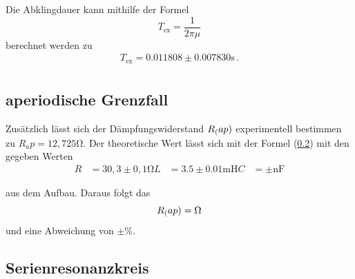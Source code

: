 \noindent
Die Abklingdauer kann mithilfe der Formel 
\begin{equation*}
    T_\text{ex} = \frac{1}{2\pi\mu} 
\end{equation*}
berechnet werden zu
\begin{align*}
    T_\text{ex} = 0.011808 \pm 0.007830 \si{\second} \, . \\
\end{align*}



\subsection{aperiodische Grenzfall}
Zusätzlich lässt sich der Dämpfungswiderstand $R_\text(ap)$ experimentell bestimmen zu $R_ap = 12,725 \si{\ohm}$. Der theoretische Wert lässt sich mit der Formel (\ref{}) %
mit den gegeben Werten
\begin{align*}
   R &= 30,3 \pm 0,1 \si{\ohm}
   L &= 3.5 \pm 0.01 \si{\milli\henry}
   C &= \pm \si{\nano\farad}    
\end{align*}

\noindent
aus dem Aufbau. Daraus folgt das $$ R_\text(ap) = \si{\ohm} $$ und eine Abweichung von $ \pm \si{\percent}$.

\subsection{Serienresonanzkreis}
